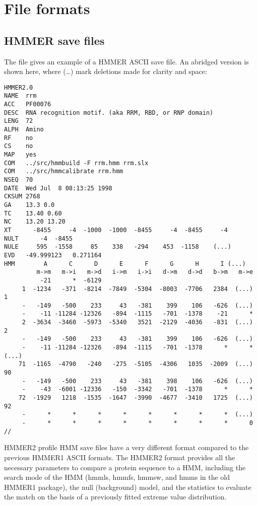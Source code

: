 \chapter{File formats}

\section{HMMER save files}

The file  gives an example of a HMMER ASCII save
file. An abridged version is shown here, where (\ldots) mark deletions
made for clarity and space:

{\small\begin{verbatim}
HMMER2.0
NAME  rrm
ACC   PF00076
DESC  RNA recognition motif. (aka RRM, RBD, or RNP domain)
LENG  72
ALPH  Amino
RF    no
CS    no
MAP   yes
COM   ../src/hmmbuild -F rrm.hmm rrm.slx
COM   ../src/hmmcalibrate rrm.hmm
NSEQ  70
DATE  Wed Jul  8 08:13:25 1998
CKSUM 2768
GA    13.3 0.0
TC    13.40 0.60
NC    13.20 13.20
XT      -8455     -4  -1000  -1000  -8455     -4  -8455     -4 
NULT      -4  -8455
NULE     595  -1558     85    338   -294    453  -1158    (...)
EVD   -49.999123   0.271164
HMM        A      C      D      E      F      G      H      I (...)
         m->m   m->i   m->d   i->m   i->i   d->m   d->d   b->m   m->e
          -21      *  -6129
     1  -1234   -371  -8214  -7849  -5304  -8003  -7706   2384  (...) 1
     -   -149   -500    233     43   -381    399    106   -626  (...)
     -    -11 -11284 -12326   -894  -1115   -701  -1378    -21      * 
     2  -3634  -3460  -5973  -5340   3521  -2129  -4036   -831  (...) 2
     -   -149   -500    233     43   -381    399    106   -626  (...)
     -    -11 -11284 -12326   -894  -1115   -701  -1378      *      * 
(...)
    71  -1165  -4790   -240   -275  -5105  -4306   1035  -2009  (...) 90
     -   -149   -500    233     43   -381    398    106   -626  (...)
     -    -43  -6001 -12336   -150  -3342   -701  -1378      *      * 
    72  -1929   1218  -1535  -1647  -3990  -4677  -3410   1725  (...) 92
     -      *      *      *      *      *      *      *      *  (...) 
     -      *      *      *      *      *      *      *      *      0 
//
\end{verbatim}}

HMMER2 profile HMM save files have a very different format compared to
the previous HMMER1 ASCII formats. The HMMER2 format provides all the
necessary parameters to compare a protein sequence to a HMM, including
the search mode of the HMM (hmmls, hmmfs, hmmsw, and hmms in the old
HMMER1 package), the null (background) model, and the statistics to
evaluate the match on the basis of a previously fitted extreme value
distribution.

